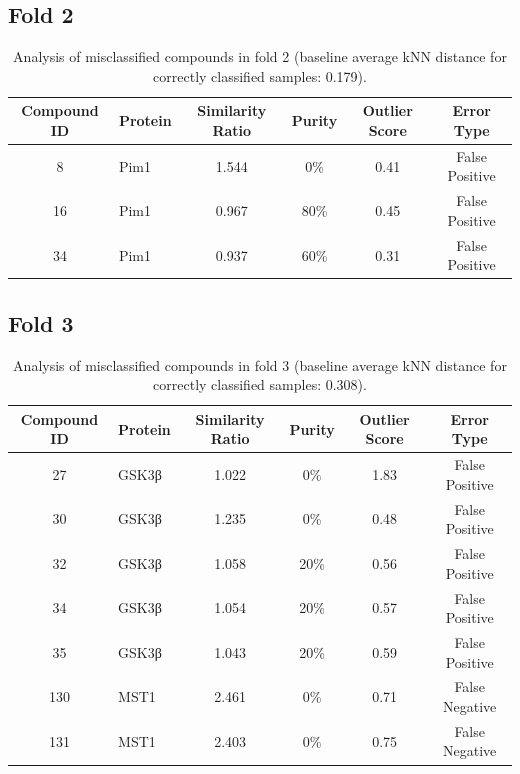 \documentclass{article}
\newenvironment{smarttabular}[1]{%
    \begin{tabular}{#1}%
}{%
    \end{tabular}%
}
\begin{document}
\clearpage

\subsection{Fold 2}

\begin{table}[H]
    \centering
    \small
    \caption{Analysis of misclassified compounds in fold 2 (baseline average kNN distance for correctly classified samples: 0.179).}
    \label{tab:misclassified_compounds_2}
    \begin{smarttabular}{clcccc}
        \toprule
        \textbf{Compound ID} & \textbf{Protein} & \textbf{Similarity Ratio} & \textbf{Purity} & \textbf{Outlier Score} & \textbf{Error Type} \\
        \midrule
        8 & Pim1 & 1.544 & 0\% & 0.41 & False Positive \\
        16 & Pim1 & 0.967 & 80\% & 0.45 & False Positive \\
        34 & Pim1 & 0.937 & 60\% & 0.31 & False Positive \\
        \bottomrule
    \end{smarttabular}
\end{table}

\clearpage

\subsection{Fold 3}

\begin{table}[H]
    \centering
    \small
    \caption{Analysis of misclassified compounds in fold 3 (baseline average kNN distance for correctly classified samples: 0.308).}
    \label{tab:misclassified_compounds_3}
    \begin{smarttabular}{clcccc}
        \toprule
        \textbf{Compound ID} & \textbf{Protein} & \textbf{Similarity Ratio} & \textbf{Purity} & \textbf{Outlier Score} & \textbf{Error Type} \\
        \midrule
        27 & GSK3β & 1.022 & 0\% & 1.83 & False Positive \\
        30 & GSK3β & 1.235 & 0\% & 0.48 & False Positive \\
        32 & GSK3β & 1.058 & 20\% & 0.56 & False Positive \\
        34 & GSK3β & 1.054 & 20\% & 0.57 & False Positive \\
        35 & GSK3β & 1.043 & 20\% & 0.59 & False Positive \\
        130 & MST1 & 2.461 & 0\% & 0.71 & False Negative \\
        131 & MST1 & 2.403 & 0\% & 0.75 & False Negative \\
        \bottomrule
    \end{smarttabular}
\end{table}
\end{document}
